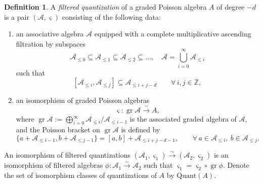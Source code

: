\documentclass[11pt, a4paper]{amsart}
\newcommand{\C}{\mathbb{C}}
\newcommand{\Z}{\mathbb{Z}}
\newcommand{\gr}{\operatorname{gr}}
\newcommand{\cA}{\mathcal{A}}
\newcommand{\cO}{\mathcal{O}}
\newcommand{\cm}{\C^\times}
\theoremstyle{definition}
\newtheorem{defi}[Thm]{Definition}
\numberwithin{equation}{section}
\begin{document}
\begin{defi}\label{defn:filtered_quant}
	A \emph{filtered quantization} of a graded Poisson algebra $A$ of degree $-d$ is a pair $(\cA,\varsigma)$ consisting of the following data:
	\begin{enumerate}[label=(\roman*)]
    	\item an associative algebra $\cA$ equipped with a complete multiplicative ascending filtration by subspaces
    	\[ \cA_{\leqslant 0} \subseteq \cA_{\leqslant 1} \subseteq \cA_{\leqslant 2} \subseteq \ldots, \quad \cA = \bigcup_{i=0}^{\infty} \cA_{\leqslant i} \]
    	such that
    	\[ [\cA_{\leqslant i}, \cA_{\leqslant j}] \subseteq \cA_{\leqslant i+j-d} \qquad \forall\,i,j \in \Z,\]
    	
    	\item an isomorphism of graded Poisson algebras
    	\[ \varsigma: \gr\cA \xrightarrow{\, \sim \,} A, \]
    	where $\gr\cA := \bigoplus_{i=0}^{\infty} \cA_{\leqslant i} / \cA_{\leqslant i-1}$ is the associated graded algebra of $\cA$, and
		the Poisson bracket on $\gr\cA$ is defined by
    	\[ \{a+\cA_{\leqslant i-1}, b+\cA_{\leqslant j-1}\} = [a,b]+\cA_{\leqslant i+j-d-1}, \qquad \forall\,a \in \cA_{\leqslant i}, \ b \in \cA_{\leqslant j}.\]
	\end{enumerate}
	An isomorphism of filtered quantizations $(\cA_1, \varsigma_1) \xrightarrow{\sim} (\cA_2, \varsigma_2)$ is an isomorphism of filtered algebras $\phi: \cA_1 \xrightarrow{\sim} \cA_2$ such that $\varsigma_1 = \varsigma_2 \circ \gr\phi$. Denote the set of isomorphism classes of quantizations of $A$ by $\mathrm{Quant}(A)$.
\end{defi}


\end{document}
